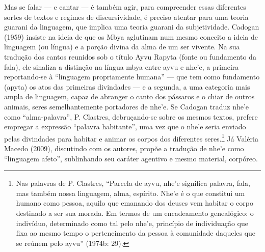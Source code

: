 \documentclass{article}
\begin{document}
Mas se falar --- e cantar --- \'e tamb\'em agir, para compreender essas
diferentes sortes de textos e regimes de discursividade, \'e preciso
atentar para uma teoria guarani da linguagem, que implica uma teoria
guarani da subjetividade. Cadogan (1959) insiste na ideia de que os
Mbya aglutinam num mesmo conceito a ideia de linguagem (ou l\'ingua) e
a por\c{c}\~ao divina da alma de um ser vivente. Na sua tradu\c{c}\~ao
dos cantos reunidos sob o t\'itulo Ayvu Rapyta (fonte ou fundamento da
fala), ele sinaliza a distin\c{c}\~ao na l\'ingua mbya entre ayvu e
nhe{\textquoteright}e, a primeira reportando-se \`a
{\textquotedblleft}linguagem propriamente humana{\textquotedblright}
--- que tem como fundamento (apyta) os atos das primeiras divindades
--- e a segunda, a uma categoria mais ampla de linguagem, capaz de
abranger o canto dos p\'assaros e o chiar de outros animais, seres
semelhantemente portadores de nhe{\textquoteright}e. Se Cadogan traduz
nhe{\textquoteright}e como
{\textquotedblleft}alma-palavra{\textquotedblright}, P. Clastres,
debru\c{c}ando-se sobre os mesmos textos, prefere empregar a
express\~ao {\textquotedblleft}palavra habitante{\textquotedblright},
uma vez que o nhe{\textquoteright}e seria enviado pelas divindades para
habitar e animar os corpos dos diferentes seres.\footnote{ Nas palavras
de P. Clastres, {\textquotedblleft}Parcela de ayvu,
nhe{\textquoteright}e significa palavra, fala, mas tamb\'em nossa
linguagem, alma, esp\'irito. Nhe{\textquoteright}e \'e o que constitui
um humano como pessoa, aquilo que emanando dos deuses vem habitar o
corpo destinado a ser sua morada. Em termos de um encadeamento
geneal\'ogico: o indiv\'iduo, determinado como tal pelo
nhe{\textquoteright}e, princ\'ipio de individua\c{c}\~ao que fixa ao
mesmo tempo o pertencimento da pessoa \`a comunidade daqueles que se
re\'unem pelo ayvu{\textquotedblright} (1974b: 29).} J\'a Val\'eria
Macedo (2009), discutindo com os autores, prop\~oe a tradu\c{c}\~ao de
nhe{\textquoteright}e como {\textquotedblleft}linguagem
afeto{\textquotedblright}, sublinhando seu car\'ater agentivo e mesmo
material, corp\'oreo. 
\end{document}
